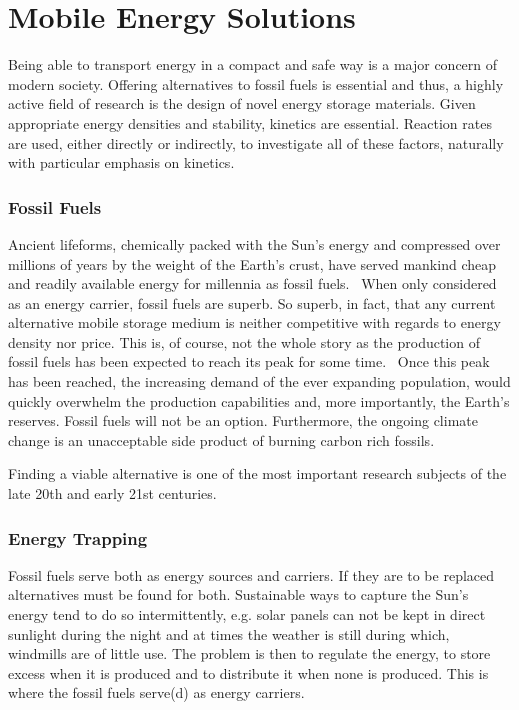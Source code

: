 \section{Mobile Energy Solutions}
Being able to transport energy in a compact and safe way is a major concern of modern society.
Offering alternatives to fossil fuels is essential and thus, a highly active field of research is the design of novel energy storage materials.
Given appropriate energy densities and stability, kinetics are essential.
Reaction rates are used, either directly or indirectly, to investigate all of these factors, naturally with particular emphasis on kinetics.

\subsubsection{Fossil Fuels}
Ancient lifeforms, chemically packed with the Sun's energy and compressed over millions of years by the weight of the Earth's crust, have served mankind cheap and readily available energy for millennia as fossil fuels.~\cite{early-oil-use}
When only considered as an energy carrier, fossil fuels are superb.
So superb, in fact, that any current alternative mobile storage medium is neither competitive with regards to energy density nor price.
This is, of course, not the whole story as the production of fossil fuels has been expected to reach its peak for some time.~\cite{peak-oil-1956}
Once this peak has been reached, the increasing demand of the ever expanding population, would quickly overwhelm the production capabilities and, more importantly, the Earth's reserves.
Fossil fuels will not be an option.
Furthermore, the ongoing climate change is an unacceptable side product of burning carbon rich fossils.~\cite{climate-change-2007}

Finding a viable alternative is one of the most important research subjects of the late 20th and early 21st centuries.

\subsubsection{Energy Trapping}
Fossil fuels serve both as energy sources and carriers.
If they are to be replaced alternatives must be found for both.
Sustainable ways to capture the Sun's energy tend to do so intermittently, e.g. solar panels can not be kept in direct sunlight during the night and at times the weather is still during which, windmills are of little use.
The problem is then to regulate the energy, to store excess when it is produced and to distribute it when none is produced.
This is where the fossil fuels serve(d) as energy carriers.

